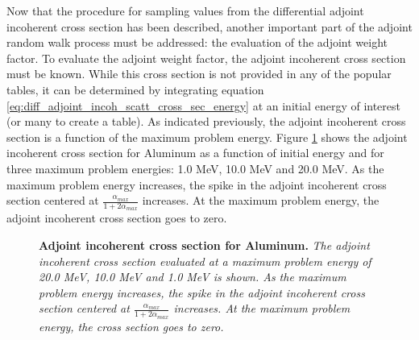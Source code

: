 Now that the procedure for sampling values from the differential adjoint 
incoherent cross section has been described, another important part of the 
adjoint random walk process must be addressed: the evaluation of the adjoint
weight factor. To evaluate the adjoint weight factor, the adjoint incoherent 
cross section must be known. While this cross section is not provided in any of 
the popular tables, it can be determined by integrating equation 
\ref{eq:diff_adjoint_incoh_scatt_cross_sec_energy} at an initial energy of
interest (or many to create a table). As indicated previously, the adjoint
incoherent cross section is a function of the maximum problem energy. Figure
\ref{fig:adjoint_incoh_cross_sec} shows the adjoint incoherent cross section 
for Aluminum as a function of initial energy and for three maximum problem 
energies: 1.0 MeV, 10.0 MeV and 20.0 MeV. As the maximum problem energy 
increases, the spike in the adjoint incoherent cross section centered at 
$\frac{\alpha_{max}}{1+2\alpha_{max}}$ increases. At the maximum problem energy, 
the adjoint incoherent cross section goes to zero.
\begin{figure}[t!]
  \begin{center}
  \end{center}
  \caption{\textbf{Adjoint incoherent cross section for Aluminum.}
    \textit{The adjoint incoherent cross section evaluated at a maximum
      problem energy of 20.0 MeV, 10.0 MeV and 1.0 MeV is shown. As the 
      maximum problem energy increases, the spike in the adjoint incoherent
      cross section centered at $\frac{\alpha_{max}}{1+2\alpha_{max}}$ 
      increases. At the maximum problem energy, the cross section goes to 
      zero.}}
  \label{fig:adjoint_incoh_cross_sec}
\end{figure}

